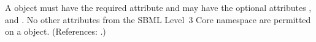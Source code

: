 A \UnitDefinition object must have the required attribute  and
may have the optional attributes ,  and
.  No other attributes from the SBML Level~3 Core namespace are
permitted on a \UnitDefinition object.  (References: .)
